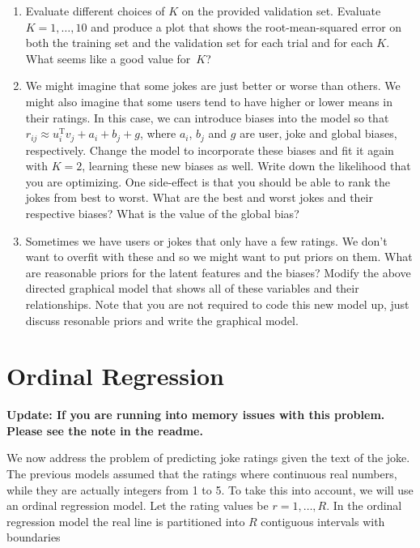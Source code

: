 \documentclass[10pt]{harvardml}
\theoremstyle{plain}
\begin{document}
\begin{problem}
\begin{enumerate}[label=(\alph*)]
\item Evaluate different choices of $K$ on the provided validation set. Evaluate $K = 1,
\ldots, 10$ and produce a plot that shows the root-mean-squared error on both
the training set and the validation set for each trial and for each $K$. What
seems like a good value for~$K$?

 \item We might imagine that some jokes are just better or worse than others.
We might also imagine that some users tend to have higher or lower means in
their ratings. In this case, we can introduce biases into the model so that
$r_{ij} \approx u_i^\text{T} v_j + a_i + b_j + g$, where $a_i$, $b_j$ and $g$ are user,
joke and global biases, respectively.  Change the model to incorporate these
biases and fit it again with $K=2$, learning these new biases as well. Write
down the likelihood that you are optimizing. One side-effect is that you should
be able to rank the jokes from best to worst. What are the best and worst jokes
and their respective biases?  What is the value of the global bias?

 \item Sometimes we have users or jokes that only have a few ratings. We don't
want to overfit with these and so we might want to put priors on them. What are
reasonable priors for the latent features and the biases? Modify the above directed
graphical model that shows all of these variables and their relationships.
Note that you are not required to code this new model up, just discuss
resonable priors and write the graphical model.


\end{enumerate}
\end{problem}



\section*{Ordinal Regression}

\textbf{Update: If you are running into memory issues with this problem. Please see the note in the
readme.}


We now address the problem of predicting joke ratings given the text of the
joke. The previous models assumed that the ratings where continuous real
numbers, while they are actually integers from 1 to 5. To take this into
account, we will use an ordinal regression model.
Let the rating values
be $r = 1,\ldots,R$. In the ordinal regression model the real line is
partitioned into $R$ contiguous intervals with boundaries
\end{document}
